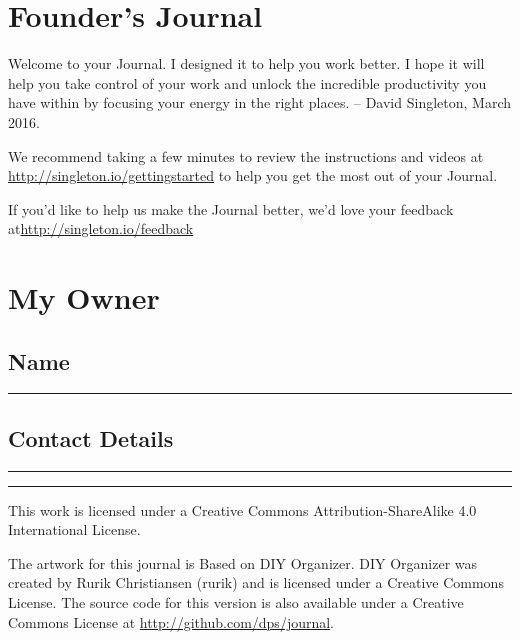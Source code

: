 \section{Founder's Journal}

Welcome to your Journal.  I designed it to help you work better.  I hope it will help you take control of your work and unlock the incredible productivity you have within by focusing your energy in the right places.
-- David Singleton, March 2016.
\par
We recommend taking a few minutes to review the instructions and videos at \url{http://singleton.io/gettingstarted} to help you get the most out of your Journal.
\par

If you'd like to help us make the Journal better, we'd love your feedback at\linebreak \url{http://singleton.io/feedback}


\section{My Owner}

\subsection{Name}
{\color{WriteBgMain}
\rule{\textwidth}{1pt}\par}

\subsection{Contact Details}
{\color{WriteBgMain}
\rule{\textwidth}{1pt}\par
\rule{\textwidth}{1pt}\par}

\pagebreak
This work is licensed under a Creative Commons Attribution-ShareAlike 4.0 International License.

The artwork for this journal is Based on DIY Organizer.  DIY Organizer was created by Rurik Christiansen (rurik) and is licensed under a Creative Commons License.  The source code for this version is also available under a Creative Commons License at \url{http://github.com/dps/journal}.

\pagebreak
